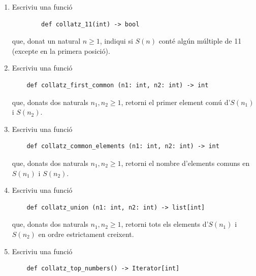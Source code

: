 \begin{enumerate}
    que, donat un natural $n\ge1$, retorni una tupla amb la posició de l'element més alt d'$S(n)$ i el seu valor. Les posicions es comencen a comptar des de zero.

    \item Escriviu una funció 

    \begin{lstlisting}
        def collatz_11(int) -> bool
    \end{lstlisting}\vspace*{-6mm}

    que, donat un natural $n\ge1$, indiqui si $S(n)$ conté algún múltiple de 11 (excepte en la primera posició).

    \item Escriviu una funció 

    \begin{lstlisting}
    def collatz_first_common (n1: int, n2: int) -> int
    \end{lstlisting}\vspace*{-6mm}

    que, donats dos naturals $n_1,n_2\ge1$, retorni el primer element comú d'$S(n_1)$ i $S(n_2)$.

    \item Escriviu una funció 

    \begin{lstlisting}
    def collatz_common_elements (n1: int, n2: int) -> int
    \end{lstlisting}\vspace*{-6mm}
    
    que, donats dos naturals $n_1,n_2\ge1$, retorni el nombre d'elements comuns en $S(n_1)$ i $S(n_2)$.

    \item Escriviu una funció 

    \begin{lstlisting}
    def collatz_union (n1: int, n2: int) -> list[int]
    \end{lstlisting}\vspace*{-6mm}

    que, donats dos naturals $n_1,n_2\ge1$, retorni tots els elements d'$S(n_1)$ i $S(n_2)$ en ordre estrictament creixent.

    \item Escriviu una funció 

    \begin{lstlisting}
    def collatz_top_numbers() -> Iterator[int]
    \end{lstlisting}\vspace*{-6mm}


\end{enumerate}
